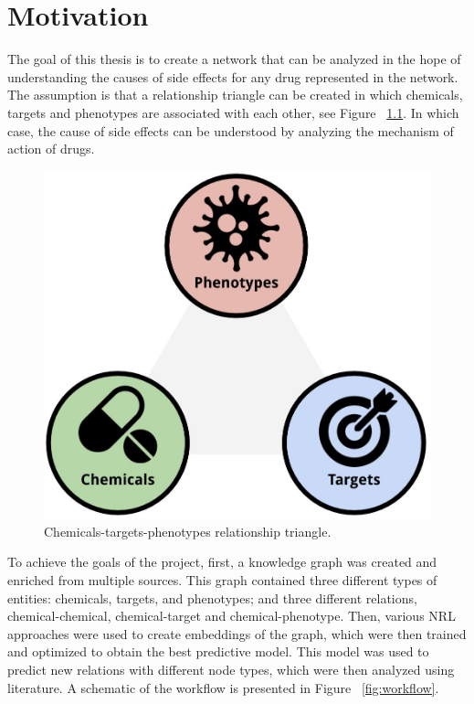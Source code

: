 \chapter{Motivation}
\label{motivation}

The goal of this thesis is to create a network that can be analyzed in the hope of understanding the causes of side effects for any drug represented in the network.
The assumption is that a relationship triangle can be created in which chemicals, targets and phenotypes are associated with each other, see Figure ~\ref{fig:triangle}.
In which case, the cause of side effects can be understood by analyzing the mechanism of action of drugs.

\begin{figure}[!ht]
    \centering
    \includegraphics[scale=0.175]
    {figures/triangle.jpg}
    \caption{\label{fig:triangle} Chemicals-targets-phenotypes relationship triangle.}
\end{figure}

To achieve the goals of the project, first, a knowledge graph was created and enriched from multiple sources.
This graph contained three different types of entities: chemicals, targets, and phenotypes; and three different relations, chemical-chemical, chemical-target and chemical-phenotype.
Then, various \ac{NRL} approaches were used to create embeddings of the graph, which were then trained and optimized to obtain the best predictive model.
This model was used to predict new relations with different node types, which were then analyzed using literature.
A schematic of the workflow is presented in Figure ~\ref{fig:workflow}.

